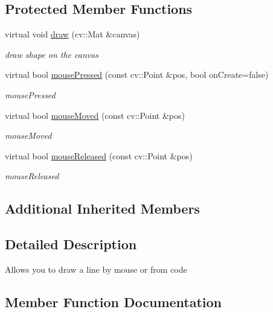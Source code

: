 \subsection*{Protected Member Functions}
\begin{DoxyCompactItemize}
\item 
virtual void \hyperlink{classcanvascv_1_1Line_aad801107019337b6e369fed331539d56}{draw} (cv\+::\+Mat \&canvas)
\begin{DoxyCompactList}\small\item\em draw shape on the canvas \end{DoxyCompactList}\item 
virtual bool \hyperlink{classcanvascv_1_1Line_aab4d23d336fe71c6d7000d8da9a54269}{mouse\+Pressed} (const cv\+::\+Point \&pos, bool on\+Create=false)
\begin{DoxyCompactList}\small\item\em mouse\+Pressed \end{DoxyCompactList}\item 
virtual bool \hyperlink{classcanvascv_1_1Line_ad758464d98d455d2ea3aa591667fb595}{mouse\+Moved} (const cv\+::\+Point \&pos)
\begin{DoxyCompactList}\small\item\em mouse\+Moved \end{DoxyCompactList}\item 
virtual bool \hyperlink{classcanvascv_1_1Line_ace7269cabd2acbb2c9da009740f46fa3}{mouse\+Released} (const cv\+::\+Point \&pos)
\begin{DoxyCompactList}\small\item\em mouse\+Released \end{DoxyCompactList}\end{DoxyCompactItemize}
\subsection*{Additional Inherited Members}


\subsection{Detailed Description}
Allows you to draw a line by mouse or from code 

\subsection{Member Function Documentation}
